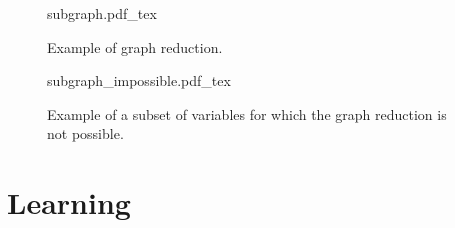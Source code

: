 \begin{figure}
	\centering
\def\svgwidth{0.7 \textwidth}
{subgraph.pdf_tex}
	\caption{Example of graph reduction.}
	\label{fig:00:subgraph}
\end{figure} 

\begin{figure}
	\centering
\def\svgwidth{0.2 \textwidth}
{subgraph_impossible.pdf_tex}
	\caption{Example of a subset of variables for which the graph reduction is not possible.}
	\label{fig:00:subgraph_impossible}
\end{figure} 

\section{Learning}
\label{sec:00:LEARN}

